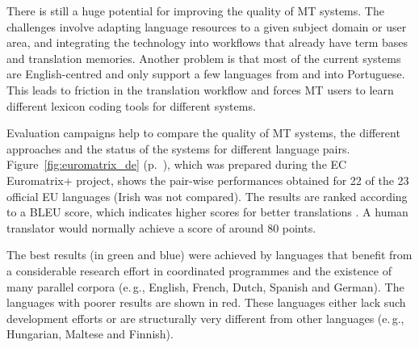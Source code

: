 \documentclass[]{../metanetpaper}
\begin{document}
\begin{multicols}{2}
There is still a huge potential for improving the quality of MT systems. The challenges involve adapting language resources to a given subject domain or user area, and integrating the technology into workflows that already have term bases and translation memories. Another problem is that most of the current systems are English-centred and only support a few languages from and into Portuguese. This leads to friction in the translation workflow and forces MT users to learn different lexicon coding tools for different systems.

Evaluation campaigns help to compare the quality of MT systems, the different approaches and the status of the systems for different language pairs. Figure~\ref{fig:euromatrix_de} (p.~\pageref{fig:euromatrix_de}), which was prepared during the EC Euromatrix+ project, shows the pair-wise performances obtained for 22 of the 23 official EU languages (Irish was not compared). The results are ranked according to a BLEU score, which indicates higher scores for better translations \cite{bleu1}. A human translator would normally achieve a score of around 80 points.

The best results (in green and blue) were achieved by languages that benefit from a considerable research effort in coordinated programmes and the existence of many parallel corpora (e.\,g., English, French, Dutch, Spanish and German). The languages with poorer results are shown in red. These languages either lack such development efforts or are structurally very different from other languages (e.\,g., Hungarian, Maltese and Finnish).


\end{multicols}
\end{document}
